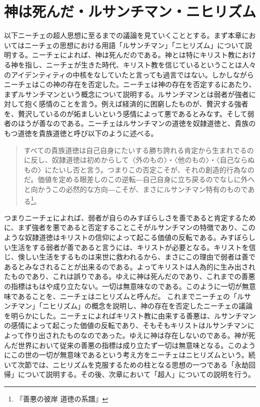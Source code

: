 \documentclass[b5j,twoside,twocolumn]{utarticle}
\begin{document}
\section{神は死んだ・ルサンチマン・ニヒリズム}
以下ニーチェの超人思想に至るまでの議論を見ていくこととする。まず本章においてはニーチェの思想における用語「ルサンチマン」「ニヒリズム」について説明する。ニーチェによれば、神は死んだのである。神とは特にキリスト教における神を指し、ニーチェが生きた時代、キリスト教を信じているということは人々のアイデンティティの中核をなしていたと言っても過言ではない。しかしながらニーチェはこの神の存在を否定した。ニーチェは神の存在を否定するにあたり、まずルサンチマンという概念について説明する。ルサンチマンとは弱者が強者に対して抱く感情のことを言う。例えば経済的に困窮したものが、贅沢する強者を、贅沢しているのが妬ましいという感情によって悪であるとみなす。そして弱者のほうが善なのである。ニーチェはルサンチマンの道徳を奴隷道徳と、貴族のもつ道徳を貴族道徳と呼び以下のように述べる。
\begin{quote}
すべての貴族道徳は自己自身にたいする勝ち誇れる肯定から生まれでるのに反し、奴隷道徳は初めからして〈外のもの〉・〈他のもの〉・〈自己ならぬもの〉にたいし否と言う。つまりこの否定こそが、それの創造的行為なのだ。価値を定める眼差しのこの逆転―自己自身に立ち戻るのでなしに外へと向かうこの必然的な方向―こそが、まさにルサンチマン特有のものである\footnote{『善悪の彼岸 道徳の系譜』}。
\end{quote}


つまりニーチェによれば、弱者が自らのみすぼらしさを善であると肯定するために、まず強者を悪であると否定することこそがルサンチマンの特徴であり、このような奴隷道徳はキリストの信仰によって起こる価値の反転である。みすぼらしい生活をする弱者が善であると言うには、キリストが必要となる。キリストを信じ、倹しい生活をするものは来世に救われるから、まさにこの理由で弱者は善であるとみなされることが出来るのである。よってキリストは人為的に生み出されたものであり、これは誤りである。ゆえに神は死んだのであり、これまでの善悪の指標はもはや成り立たない。一切は無意味なのである。このように一切が無意味であることを、ニーチェはニヒリズムと呼んだ。
これまでニーチェの「ルサンチマン」「ニヒリズム」の概念を説明し、神の存在を否定したニーチェの議論を明らかにした。ニーチェによればキリスト教に由来する善悪は、ルサンチマンの感情によって起こった価値の反転であり、そもそもキリストはルサンチマンによって作り出されたものなのであった。ゆえに神は存在しないのである。神が死んだ世界において従来の善悪の指標は成り立たず一切は無意味となる。このようにこの世の一切が無意味であるという考え方をニーチェはニヒリズムという。続いて次節では、ニヒリズムを克服するための柱となる思想の一つである「永劫回帰」について説明する。その後、次章において「超人」についての説明を行う。%
\end{document}
